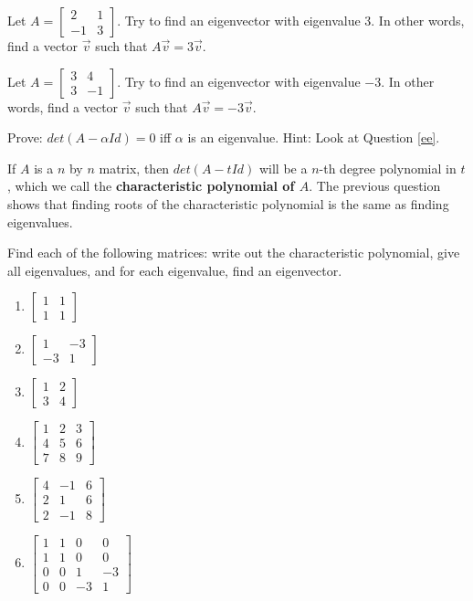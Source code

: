 \bq Let $A=\begin{bmatrix} 2&1\\-1&3 \end{bmatrix}$. Try to find an eigenvector with eigenvalue $3$. In other words, find a vector $\vec{v}$ such that $A\vec{v}=3\vec{v}$.
\eq

\bq Let $A=\begin{bmatrix} 3&4\\3&-1 \end{bmatrix}$. Try to find an eigenvector with eigenvalue $-3$. In other words, find a vector $\vec{v}$ such that $A\vec{v}=-3\vec{v}$.
\eq

\bq Prove: $det(A- \alpha Id)=0$ iff $\alpha$ is an eigenvalue. Hint: Look at Question \ref{ee}.
\eq

If $A$ is a $n$ by $n$ matrix, then $det(A- t Id)$ will be a $n$-th degree polynomial in $t$, which we call the \textbf{characteristic polynomial of $A$}. The previous question shows that finding roots of the characteristic polynomial is the same as finding eigenvalues.

\bq Find each of the following matrices: write out the characteristic polynomial, give all eigenvalues, and for each eigenvalue, find an eigenvector.
\begin{enumerate}
\item $\begin{bmatrix} 1&1 \\1&1 \end{bmatrix}$
\item $\begin{bmatrix} 1&-3 \\-3&1 \end{bmatrix}$
\item $\begin{bmatrix} 1&2 \\3&4 \end{bmatrix}$
\item $\begin{bmatrix} 1&2&3 \\4&5&6\\7&8&9 \end{bmatrix}$
\item $\begin{bmatrix} 4&-1&6\\2&1&6\\2&-1&8 \end{bmatrix}$
\item $\begin{bmatrix} 1&1&0&0\\1&1&0&0\\0&0&1&-3\\0&0&-3&1 \end{bmatrix}$
\end{enumerate}
\eq

